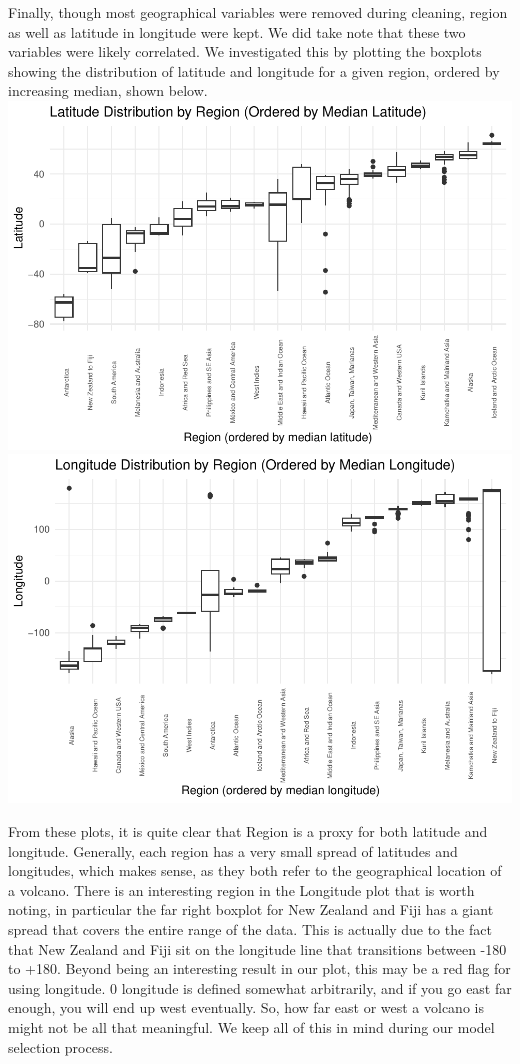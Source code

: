 \documentclass[
  12pt,
]{article}
\begin{document}
Finally, though most geographical variables were removed during
cleaning, region as well as latitude in longitude were kept. We did take
note that these two variables were likely correlated. We investigated
this by plotting the boxplots showing the distribution of latitude and
longitude for a given region, ordered by increasing median, shown below.
\includegraphics{Report_files/figure-latex/unnamed-chunk-3-1.pdf}
\includegraphics{Report_files/figure-latex/unnamed-chunk-3-2.pdf}

From these plots, it is quite clear that Region is a proxy for both
latitude and longitude. Generally, each region has a very small spread
of latitudes and longitudes, which makes sense, as they both refer to
the geographical location of a volcano. There is an interesting region
in the Longitude plot that is worth noting, in particular the far right
boxplot for New Zealand and Fiji has a giant spread that covers the
entire range of the data. This is actually due to the fact that New
Zealand and Fiji sit on the longitude line that transitions between -180
to +180. Beyond being an interesting result in our plot, this may be a
red flag for using longitude. 0 longitude is defined somewhat
arbitrarily, and if you go east far enough, you will end up west
eventually. So, how far east or west a volcano is might not be all that
meaningful. We keep all of this in mind during our model selection
process.
\end{document}

